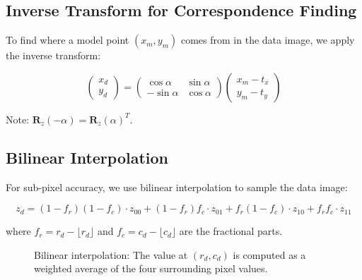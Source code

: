 \documentclass[11pt,a4paper]{article}
\begin{document}
\subsection{Inverse Transform for Correspondence Finding}

To find where a model point $(x_m, y_m)$ comes from in the data image, we apply the inverse transform:

\begin{equation}
\begin{pmatrix} x_d \\ y_d \end{pmatrix} =
\begin{pmatrix} \cos\alpha & \sin\alpha \\ -\sin\alpha & \cos\alpha \end{pmatrix}
\begin{pmatrix} x_m - t_x \\ y_m - t_y \end{pmatrix}
\end{equation}

Note: $\mathbf{R}_z(-\alpha) = \mathbf{R}_z(\alpha)^T$.

\subsection{Bilinear Interpolation}

For sub-pixel accuracy, we use bilinear interpolation to sample the data image:

\begin{equation}
z_d = (1-f_r)(1-f_c) \cdot z_{00} + (1-f_r)f_c \cdot z_{01} + f_r(1-f_c) \cdot z_{10} + f_r f_c \cdot z_{11}
\end{equation}

where $f_r = r_d - \lfloor r_d \rfloor$ and $f_c = c_d - \lfloor c_d \rfloor$ are the fractional parts.

\begin{figure}[h]
\centering
{}
\caption{Bilinear interpolation: The value at $(r_d, c_d)$ is computed as a weighted average of the four surrounding pixel values.}
\end{figure}
\end{document}
